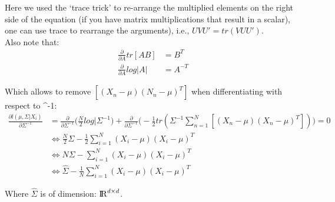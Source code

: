 \documentclass{amsart}
\theoremstyle{definition}
\theoremstyle{remark}
\numberwithin{equation}{section}
\begin{document}
Here we used the `trace trick' to re-arrange the multiplied elements on the right
side of the equation (if you have matrix multiplications that result in a scalar),
one can use trace to rearrange the arguments), i.e., $UVU' = tr(VUU')$. \\

Also note that:\\

\begin{equation}
    \begin{align}
    \frac{\partial}{\partial A} tr[AB] & = B^T \\
    \frac{\partial}{\partial A} log|A| & = A^{-T}
    \end{align}
\end{equation}

Which allows to remove $[(X_n-\mu)(N_n-\mu)^T]$ when differentiating with 
respect to \Sigma^{-1}: \\

\begin{equation}
    \begin{align}
    \frac{\partial l(\mu, \Sigma|X_i)}{\partial\Sigma^{-1}} & = 
        \frac{\partial}{\partial\Sigma^{-1}}\big(\frac{N}{2}log|\Sigma^{-1}\big) + 
        \frac{\partial}{\partial\Sigma^{-1}}\big(-\frac{1}{2}tr(\Sigma^{-1}\sum_{n=1}^{N}[(X_n-\mu)(X_n-\mu)^T])\big) = 0 \\
    & \Leftrightarrow \frac{N}{2} \Sigma -\frac{1}{2}\sum_{i=1}^{N}(X_i-\mu)(X_i-\mu)^T \\
    & \Leftrightarrow N\Sigma - \sum_{i=1}^{N}(X_i-\mu)(X_i-\mu)^T \\
    & \Leftrightarrow \hat\Sigma - \frac{1}{N}\sum_{i=1}^{N}(X_i-\mu)(X_i-\mu)^T
    \end{align}
\end{equation}

Where $\hat\Sigma$ is of dimension: ${\rm I\!R}^{d \times d}$. 
\end{document}
